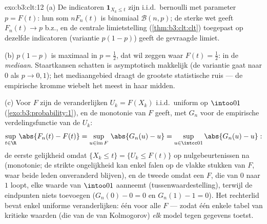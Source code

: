 \begin{solution}{exo:b3:clt:12}
(a) De indicatoren $\mathbf 1_{X_k \leq t}$ zijn i.i.d.\
bernoulli met parameter $p = F(t)$: hun som $nF_n(t)$ is
binomiaal $\mathcal B(n, p)$; de sterke wet geeft $F_n(t)
\to p$ b.z., en de centrale limietstelling
(\cref{thm:b3:clt:clt}) toegepast op dezelfde indicatoren
(variantie $p(1-p)$) geeft de gevraagde  limiet.

(b) $p(1 - p)$ is maximaal in $p = \frac12$, dat wil zeggen
waar $F(t) = \frac12$: in de \emph{mediaan}.
Staartkansen schatten is asymptotisch makkelijk (de
variantie gaat naar $0$ als $p \to 0, 1$); het
mediaangebied draagt de grootste statistische ruis --- de
empirische kromme wiebelt het meest in haar midden.

(c) Voor  $F$ zijn de veranderlijken $U_k = F(X_k)$
i.i.d.\ uniform op $\intoo01$
(\cref{exo:b3:probability:1}), en de monotonie van $F$
geeft, met $G_n$ voor de empirische verdelingsfunctie van
de $U_k$:
\[
\sup_{t\in\R}\,\abs{F_n(t) - F(t)}
= \sup_{u \in \operatorname{im}F}\,\abs{G_n(u) - u}
= \sup_{u\in\intcc01}\abs{G_n(u) - u} :
\]
de eerste gelijkheid omdat $\{X_k \leq t\} = \{U_k \leq
F(t)\}$ op nulgebeurtenissen na (monotonie; de strikte
ongelijkheid kan enkel falen op de vlakke stukken van $F$,
waar beide leden onveranderd blijven), en de tweede omdat
een  $F$, die van $0$ naar $1$ loopt, elke waarde
van $\intoo01$ aanneemt (tussenwaardestelling), terwijl de
eindpunten niets toevoegen ($G_n(0) - 0 = 0$ en $G_n(1) - 1
= 0$). Het rechterlid bevat enkel uniforme veranderlijken:
één  voor alle $F$ --- zodat één enkele tabel van
kritieke waarden (die van de \omterm{def:b3:probability:space}{verdeling} van Kolmogorov)
\emph{elk} \omterm{def:b3:topology:continuity}{continu} model tegen gegevens toetst.
\end{solution}

